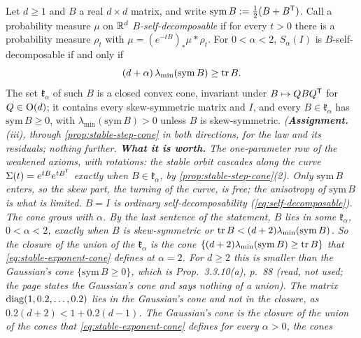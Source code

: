 \begin{proposition}
\label{prop:stable-exponent-cone}
\leanok
Let $d \ge 1$ and $B$ a real $d \times d$ matrix, and write $\mathrm{sym}\,B := \tfrac12(B + B^{\mathsf{T}})$.
Call a probability measure $\mu$ on $\mathbb{R}^d$ \emph{$B$-self-decomposable} if for every $t > 0$ there is a
probability measure $\rho_t$ with $\mu = (e^{-tB})_*\mu * \rho_t$. For $0 < \alpha < 2$, $S_\alpha(I)$
is $B$-self-decomposable if and only if
\begin{equation}\label{eq:stable-exponent-cone}
  (d+\alpha)\,\lambda_{\min}(\mathrm{sym}\,B) \ge \operatorname{tr} B .
\end{equation}
The set $\mathfrak k_\alpha$ of such $B$ is a closed convex cone, invariant under $B \mapsto QBQ^{\mathsf{T}}$ for
$Q \in \mathrm{O}(d)$; it contains every skew-symmetric matrix and $I$, and every $B \in \mathfrak k_\alpha$ has
$\mathrm{sym}\,B \ge 0$, with $\lambda_{\min}(\mathrm{sym}\,B) > 0$ unless $B$ is skew-symmetric.
\statusA\quad{}\quad\emph{(\textbf{Assignment.} (iii), through
\ref{prop:stable-step-cone} in both directions, for the law and its residuals; nothing further. \textbf{What it is worth.} The one-parameter row of the weakened
axioms, with rotations: the stable orbit cascades along the curve $\Sigma(t) = e^{tB}e^{tB^{\mathsf{T}}}$
exactly when $B \in \mathfrak k_\alpha$, by \ref{prop:stable-step-cone}(2). Only $\mathrm{sym}\,B$ enters, so
the skew part, the turning of the curve, is free; the anisotropy of $\mathrm{sym}\,B$ is what is
limited. $B = I$ is ordinary self-decomposability (\ref{eq:self-decomposable}). The cone grows with
$\alpha$. By the last sentence of the statement, $B$ lies in some $\mathfrak k_\alpha$, $0 < \alpha < 2$,
exactly when $B$ is skew-symmetric or $\operatorname{tr} B < (d+2)\lambda_{\min}(\mathrm{sym}\,B)$. So the closure of the
union of the $\mathfrak k_\alpha$ is the cone $\{(d+2)\lambda_{\min}(\mathrm{sym}\,B) \ge \operatorname{tr} B\}$ that
\ref{eq:stable-exponent-cone} defines at $\alpha = 2$. For $d \ge 2$ this is smaller than the Gaussian's cone
$\{\mathrm{sym}\,B \ge 0\}$, which is  Prop.~3.3.10(a), p.~88 (read, not used; the
page states the Gaussian's cone and says nothing of a union). The matrix $\operatorname{diag}(1, 0.2, \dots, 0.2)$ lies in
the Gaussian's cone and not in the closure, as $0.2(d+2) < 1 + 0.2(d-1)$. The Gaussian's cone is the closure
of the union of the cones that \ref{eq:stable-exponent-cone} defines for every $\alpha > 0$, the cones
}
\end{proposition}
